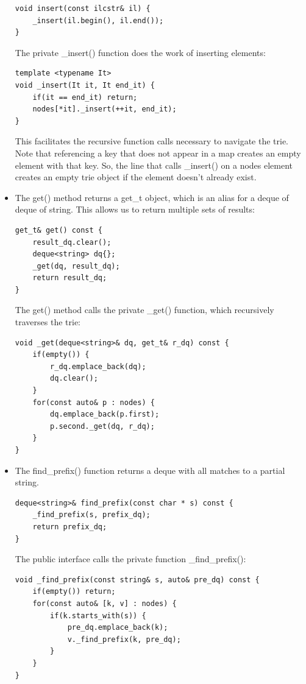\begin{itemize}
\begin{lstlisting}[style=styleCXX]
void insert(const ilcstr& il) {
	_insert(il.begin(), il.end());
}
\end{lstlisting}

The private \_insert() function does the work of inserting elements:

\begin{lstlisting}[style=styleCXX]
template <typename It>
void _insert(It it, It end_it) {
	if(it == end_it) return;
	nodes[*it]._insert(++it, end_it);
}
\end{lstlisting}

This facilitates the recursive function calls necessary to navigate the trie. Note that referencing a key that does not appear in a map creates an empty element with that key. So, the line that calls \_insert() on a nodes element creates an empty trie object if the element doesn't already exist.

\item 
The get() method returns a get\_t object, which is an alias for a deque of deque of string. This allows us to return multiple sets of results:

\begin{lstlisting}[style=styleCXX]
get_t& get() const {
	result_dq.clear();
	deque<string> dq{};
	_get(dq, result_dq);
	return result_dq;
}
\end{lstlisting}

The get() method calls the private \_get() function, which recursively traverses the trie:

\begin{lstlisting}[style=styleCXX]
void _get(deque<string>& dq, get_t& r_dq) const {
	if(empty()) {
		r_dq.emplace_back(dq);
		dq.clear();
	}
	for(const auto& p : nodes) {
		dq.emplace_back(p.first);
		p.second._get(dq, r_dq);
	}
}
\end{lstlisting}

\item 
The find\_prefix() function returns a deque with all matches to a partial string.

\begin{lstlisting}[style=styleCXX]
deque<string>& find_prefix(const char * s) const {
	_find_prefix(s, prefix_dq);
	return prefix_dq;
}
\end{lstlisting}

The public interface calls the private function \_find\_prefix():

\begin{lstlisting}[style=styleCXX]
void _find_prefix(const string& s, auto& pre_dq) const {
	if(empty()) return;
	for(const auto& [k, v] : nodes) {
		if(k.starts_with(s)) {
			pre_dq.emplace_back(k);
			v._find_prefix(k, pre_dq);
		}
	}
}
\end{lstlisting}


\end{itemize}
